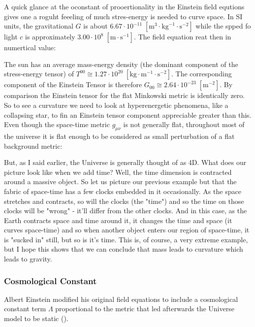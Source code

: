 	A quick glance at the oconstant of prooertionality in the Einstein field equtions gives one a roguht feeeling of much stres-energy is needed to curve space. In SI units, the gravitational $G$ is about $6.67\cdot 10^{-11}\;[\text{m}^3\cdot\text{kg}^{-1}\cdot\text{s}^{-2}]$ while the spped fo light $c$ is approximately $3.00\cdot 10^8\;[\text{m}\cdot \text{s}^{-1}]$. The field equation reat then in numertical value:
	
	The sun has an average mass-energy density (the dominant component of the stress-energy tensor) of $T^{00}\cong 1.27\cdot 10^{20}\;[\text{kg}\cdot\text{m}^{-1}\cdot\text{s}^{-2}]$. The corresponding component of the Einstein Tensor is therefore $G_{00}\cong 2.64\cdot 10^{-23}\;[\text{m}^{-2}]$. By comparison the Einstein tensor for the flat Minkowski metric is identically zero. So to see a curvature we need to look at hyperenergetic phenomena, like a collapsing star, to fin an Einstein tensor component appreciable greater than this. Even though the space-time metric $g_{\mu\nu}$ is not generally flat, throughout most of the universe it is flat enough to be considered as small perturbation of a flat background metric:
	
	But, as I said earlier, the Universe is generally thought of as 4D. What does our picture look like when we add time? Well, the time dimension is contracted around a massive object. So let us picture our previous example but that the fabric of space-time has a few clocks embedded in it occasionally. As the space stretches and contracts, so will the clocks (the "time") and so the time on those clocks will be "wrong" - it'll differ from the other clocks. And in this case, as the Earth contracts space and time around it, it changes the time and space (it curves space-time) and so when another object enters our region of space-time, it is "sucked in" still, but so is it's time. This is, of course, a very extreme example, but I hope this shows that we can conclude that mass leads to curvature which leads to gravity. 
	
	\pagebreak
	\subsubsection{Cosmological Constant}
	Albert Einstein modified his original field equations to include a cosmological constant term $\Lambda$ proportional to the metric that led afterwards the Universe model to be static ().
	
